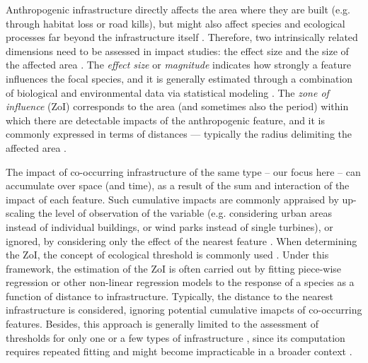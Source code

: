 \documentclass[titlepage]{article}
\begin{document}
Anthropogenic infrastructure directly affects the area where they are built (e.g. through habitat loss or road kills), but might also affect species and ecological processes far beyond the infrastructure itself \citep[by causing avoidance responses and reducing the probability of animal occurrence in its proximity;][]{johnson_cumulative_2005,torres_assessing_2016,dorber_indicators_2022}. Therefore, two intrinsically related dimensions need to be assessed in impact studies: the effect size and the size of the affected area \citep[Box 1; ][]{naugle_unifying_2011}. The \textit{effect size} or \textit{magnitude} indicates how strongly a feature influences the focal species, and it is generally estimated through a combination of biological and environmental data via statistical modeling \citep[Box 1;][]{polfus_identifying_2011}. The \textit{zone of influence} (ZoI) 
corresponds to the area (and sometimes also the period) within which there are detectable impacts of the anthropogenic feature, and it is commonly expressed in terms of distances --- typically the radius delimiting the affected area \citep[Box 1;][]{boulanger_estimating_2012}. 

The impact of co-occurring infrastructure of the same type -- our focus here -- can accumulate over space (and time), as a result of the sum and interaction of the impact of each feature. Such cumulative impacts are commonly appraised by up-scaling the level of observation of the variable (e.g. considering urban areas instead of individual buildings, or wind parks instead of single turbines), or ignored, by considering only the effect of the nearest feature \citep[e.g. nearest house or turbine;][]{torres_assessing_2016}.
When determining the ZoI, the concept of ecological threshold
is commonly used \citep[see][and analytical procedures therein]{ficetola_ecological_2009}. Under this framework, the estimation of the ZoI is often carried out by fitting piece-wise regression or other non-linear regression models \citep[e.g. exponential decay or generalized additive models;][]{skarin_out_2018, ficetola_ecological_2009} to the response of a species as a function of distance to infrastructure. Typically, the distance to the nearest infrastructure is considered, ignoring potential cumulative imapcts of co-occurring features. Besides, this approach is generally limited to the assessment of thresholds for only one or a few types of infrastructure \citep[e.g.][]{boulanger_estimating_2012}, since its computation requires repeated fitting and might become impracticable in a broader context \citep{lee_estimating_2020}. 
\end{document}
